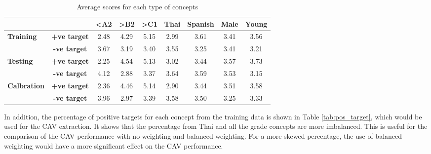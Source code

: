 \begin{table}[H]
    \centering
    \begin{tabular}{|lc|c|c|c|c|c|c|c|}
        \hline
        \multicolumn{2}{|l|}{\textbf{}}                            & \textbf{\textless{}A2} & \textbf{\textgreater{}B2} & \textbf{\textgreater{}C1} & \textbf{Thai} & \textbf{Spanish} & \textbf{Male} & \textbf{Young}        \\ \hline
        \multicolumn{1}{|l|}{\multirow{2}{*}{\textbf{Training}}}   & \textbf{+ve target}    & 2.48                      & 4.29                      & 5.15          & 2.99             & 3.61          & 3.41           & 3.56 \\ \cline{2-9}
        \multicolumn{1}{|l|}{}                                     & \textbf{-ve target}    & 3.67                      & 3.19                      & 3.40          & 3.55             & 3.25          & 3.41           & 3.21 \\ \hline
        \multicolumn{1}{|l|}{\multirow{2}{*}{\textbf{Testing}}}    & \textbf{+ve target}    & 2.25                      & 4.54                      & 5.13          & 3.02             & 3.44          & 3.57           & 3.73 \\ \cline{2-9}
        \multicolumn{1}{|l|}{}                                     & \textbf{-ve target}    & 4.12                      & 2.88                      & 3.37          & 3.64             & 3.59          & 3.53           & 3.15 \\ \hline
        \multicolumn{1}{|l|}{\multirow{2}{*}{\textbf{Calbration}}} & \textbf{+ve target}    & 2.36                      & 4.46                      & 5.14          & 2.90             & 3.44          & 3.51           & 3.58 \\ \cline{2-9}
        \multicolumn{1}{|l|}{}                                     & \textbf{-ve target}    & 3.96                      & 2.97                      & 3.39          & 3.58             & 3.50          & 3.25           & 3.33 \\ \hline
    \end{tabular}
    \caption{Average scores for each type of concepts}
    \label{tab:avg_scores}
\end{table}

In addition, the percentage of positive targets for each concept from the training data is shown in Table \ref{tab:pos_target}, which would be used for the CAV extraction. It shows that the percentage from Thai and all the grade concepts are more imbalanced. This is useful for the comparison of the CAV performance with no weighting and balanced weighting. For a more skewed percentage, the use of balanced weighting would have a more significant effect on the CAV performance.

